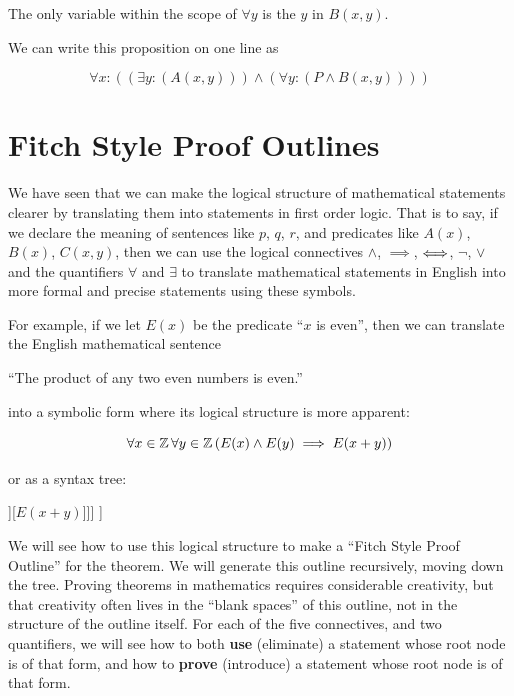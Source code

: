\begin{solutions}
	The only variable within the scope of $\forall y$ is the $y$ in $B(x,y)$.
	
	We can write this proposition on one line as
	
	\[
	\forall x: (  (\exists y: ( A(x,y)))  \wedge (\forall y: ( P \wedge  B(x,y)))  )
	\]
	
\end{solutions}

\section{Fitch Style Proof Outlines}

We have seen that we can make the logical structure of mathematical statements clearer by translating them into statements in first order logic.  That is to say, if we declare the meaning of sentences like $p$, $q$, $r$,  and predicates like $A(x)$,  $B(x)$,  $C(x,y)$, then we can use the logical connectives $\wedge$, $\implies$, $\Longleftrightarrow$, $\neg$, $\vee$ and the quantifiers $\forall$ and $\exists$ to translate mathematical statements in English into more formal and precise statements using these symbols.

For example, if we let $E(x)$ be the predicate ``$x$ is even'', then we can translate the English mathematical sentence 

{ \begin{center}
		``The product of any two even numbers is even.''
		\end{center}
}

into a symbolic form where its logical structure is more apparent:

$$
\forall x \in \mathbb{Z} \, \forall y \in \mathbb{Z} \left( E(x) \wedge E(y) \implies E(x+y) \right)
$$

or as a syntax tree:

\begin{center}
\begin{forest}
	[$\forall x \in \Z$[$\forall y \in \Z$[$\implies$[$\wedge$[$E(x)$][$E(y)$]][$E(x+y)$]]]
]
\end{forest}
\end{center}

We will see how to use this logical structure to make a ``Fitch Style Proof Outline''  for the theorem.  We will generate this outline recursively, moving down the tree.  Proving theorems in mathematics requires considerable creativity, but that creativity often lives in the ``blank spaces'' of this outline, not in the structure of the outline itself.  For each of the five connectives, and two quantifiers, we will see how to both \textbf{use} (eliminate) a statement whose root node is of that form, and how to \textbf{prove} (introduce) a statement whose root node is of that form.


